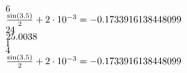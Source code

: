 \documentclass{article}
\begin{document}




$\inteval{1 + 2 + 3}$\\
$ \frac{\sin (3.5)}{2} + 2\cdot 10^{-3}
= \fpeval{{{sin(3.5)}/2} + {2 * 10^-3}} $\\
$\fpeval{fact {4}}$\\
$\fpeval{{25+ 3.6 e-3}/2 + 2e-3}$\\
$\fpeval{sind 90 }$\\
$\fpeval{ randint(4,5)}$\\
$ \frac{\sin (3.5)}{2} + 2\cdot 10^{-3}
= \fpeval{sin(3.5)/2 + 2e-3} $
\end{document}
